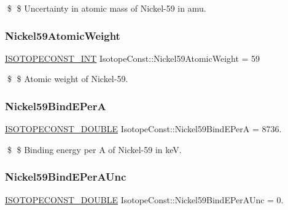 \$ \$ Uncertainty in atomic mass of Nickel-\/59 in amu. \mbox{\label{group___isotope_const-_nickel-_ni59_gaa70b774e081237d9ca7754294cf6815d}} 
\subsubsection{\texorpdfstring{Nickel59\+Atomic\+Weight}{Nickel59AtomicWeight}}
{\footnotesize\ttfamily \mbox{\hyperlink{group___isotope_const-_macros_ga5f18360b3e99483a35c32d789e62621c}{I\+S\+O\+T\+O\+P\+E\+C\+O\+N\+S\+T\+\_\+\+I\+NT}} Isotope\+Const\+::\+Nickel59\+Atomic\+Weight = 59}

\$ \$ Atomic weight of Nickel-\/59. \mbox{\label{group___isotope_const-_nickel-_ni59_gacfb15ee563b441d842a14e4a42894982}} 
\subsubsection{\texorpdfstring{Nickel59\+Bind\+E\+PerA}{Nickel59BindEPerA}}
{\footnotesize\ttfamily \mbox{\hyperlink{group___isotope_const-_macros_ga8f45a7272ce02c0b4c65c44636ed719a}{I\+S\+O\+T\+O\+P\+E\+C\+O\+N\+S\+T\+\_\+\+D\+O\+U\+B\+LE}} Isotope\+Const\+::\+Nickel59\+Bind\+E\+PerA = 8736.}

\$ \$ Binding energy per A of Nickel-\/59 in keV. \mbox{\label{group___isotope_const-_nickel-_ni59_gaca579e6881bc129c6cf511e9a33071ac}} 
\subsubsection{\texorpdfstring{Nickel59\+Bind\+E\+Per\+A\+Unc}{Nickel59BindEPerAUnc}}
{\footnotesize\ttfamily \mbox{\hyperlink{group___isotope_const-_macros_ga8f45a7272ce02c0b4c65c44636ed719a}{I\+S\+O\+T\+O\+P\+E\+C\+O\+N\+S\+T\+\_\+\+D\+O\+U\+B\+LE}} Isotope\+Const\+::\+Nickel59\+Bind\+E\+Per\+A\+Unc = 0.}


